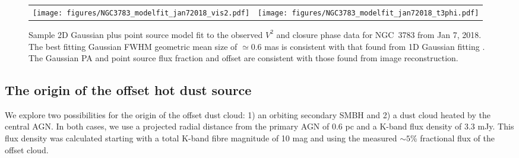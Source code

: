 \documentclass[longauth,]{aa}
\begin{document}


\begin{figure*}
\centering
\begin{tabular}{cc}
\texttt{[image: figures/NGC3783\_modelfit\_jan72018\_vis2.pdf]} &
\texttt{[image: figures/NGC3783\_modelfit\_jan72018\_t3phi.pdf]}
\end{tabular}
\caption{Sample 2D Gaussian plus point source model fit to the observed $V^2$ and closure phase data for NGC~3783 from Jan 7, 2018. The best fitting Gaussian FWHM geometric mean size of $\simeq 0.6$ mas is consistent with that found from 1D Gaussian fitting . The Gaussian PA and point source flux fraction and offset are consistent with those found from image reconstruction.}
\label{fig:dust_modelfit}
\end{figure*}


\subsection{The origin of the offset hot dust source}

We explore two possibilities for the origin of the offset dust cloud: 1) an orbiting secondary SMBH and 2) a dust cloud heated by the central AGN. 
In both cases, we use a projected radial distance from the primary AGN of 0.6 pc and a K-band flux density of 3.3 mJy. This flux density was calculated starting with a total K-band fibre magnitude of 10 mag  and using the measured $\sim5$\% fractional flux of the offset cloud.  
\end{document}
